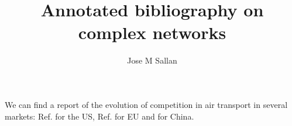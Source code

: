 \documentclass[12pt]{article}
\title{Annotated bibliography on complex networks}
\author{Jose M Sallan}
\date{}
\begin{document}
\maketitle

We can find a report of the evolution of competition in air transport in several markets: Ref. \cite{Goetz2009} for the US, Ref. \cite{Burghouwt2015} for EU and \cite{Wang2016} for China.


\nocite{*}



\end{document}
